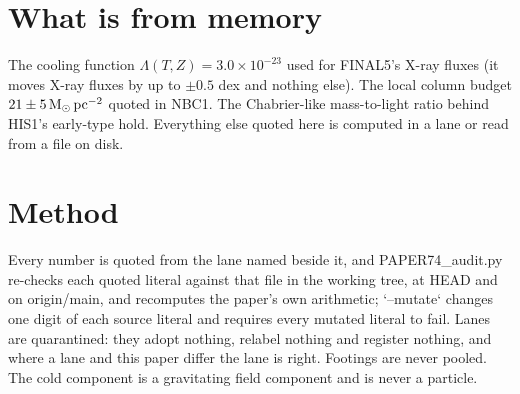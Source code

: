 \documentclass[10pt]{article}
\newcommand{\Msun}{\mathrm{M}_\odot}
\begin{document}
\section{What is from memory}
The cooling function $\Lambda(T,Z)=3.0\times10^{-23}$ used for FINAL5's X-ray fluxes (it moves X-ray fluxes by
up to $\pm0.5$ dex and nothing else). The local column budget $21\pm5\,\Msun\,{\rm pc}^{-2}$ quoted in NBC1.
The Chabrier-like mass-to-light ratio behind HIS1's early-type hold. Everything else quoted here is computed in
a lane or read from a file on disk.

\section*{Method}
Every number is quoted from the lane named beside it, and PAPER74\_audit.py re-checks each quoted literal
against that file in the working tree, at HEAD and on origin/main, and recomputes the paper's own arithmetic;
`--mutate` changes one digit of each source literal and requires every mutated literal to fail. Lanes are
quarantined: they adopt nothing, relabel nothing and register nothing, and where a lane and this paper differ
the lane is right. Footings are never pooled. The cold component is a gravitating field component and is never a
particle.
\end{document}
